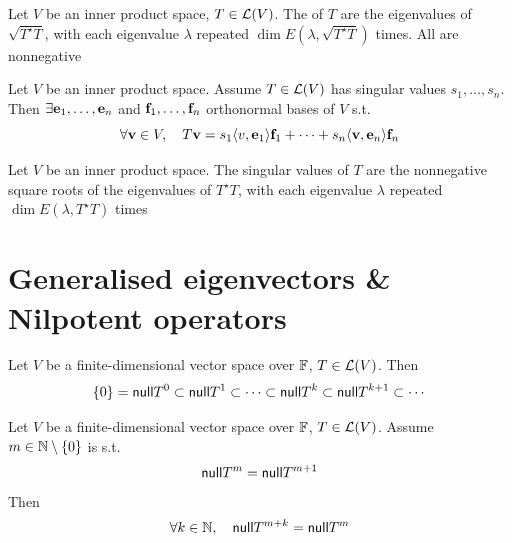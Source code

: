 \documentclass[aspectratio=169]{beamer}
\begin{document}
\begin{frame}
\begin{definition}
Let $V$ be an inner product space, $T\in\L(V)$. The  of $T$ are the eigenvalues of $\sqrt{T^\star T}$, with each eigenvalue $\lambda$ repeated $\dim E(\lambda,\sqrt{T^\star T})$ times. All are nonnegative
\end{definition}
\vfill
\begin{importanttheorem}
Let $V$ be an inner product space. Assume $T\in\L(V)$ has singular values $s_1,\ldots,s_n$. Then $\exists \be_1,\ldots,\be_n$ and $\bf_1,\ldots,\bf_n$ orthonormal bases of $V$ s.t.
\[
\forall\bv\in V,\quad
T\bv=s_1\langle v,\be_1\rangle \bf_1+\cdots+s_n\langle \bv,\be_n\rangle \bf_n
\]
\end{importanttheorem}
\vfill
\begin{theorem}
Let $V$ be an inner product space. The singular values of $T$ are the nonnegative square roots of the eigenvalues of $T^\star T$, with each eigenvalue $\lambda$ repeated $\dim E(\lambda,T^\star T)$ times
\end{theorem}
\end{frame}




\section{Generalised eigenvectors \& Nilpotent operators}


\begin{frame}
\begin{importanttheorem}
Let $V$ be a finite-dimensional vector space over $\IF$, $T\in\L(V)$. Then
\[
\{0\}=\nullspace T^0\subset \nullspace T^1\subset \cdots \subset \nullspace T^k\subset \nullspace T^{k+1}\subset \cdots
\]
\end{importanttheorem}
\vfill
\begin{importanttheorem}
Let $V$ be a finite-dimensional vector space over $\IF$, $T\in\L(V)$. 
Assume $m\in\IN\setminus\{0\}$ is s.t. 
\[
\nullspace T^m=\nullspace T^{m+1}
\]
Then
\[
\forall k\in\IN,\quad \nullspace T^{m+k}=\nullspace T^m
\]
\end{importanttheorem}
\end{frame}
\end{document}
